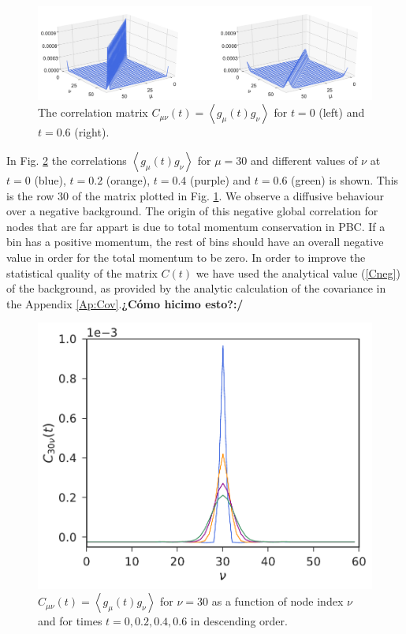 \documentclass[b5paper,openright,10pt]{book}
\newcommand{\Note}[1]{{\bf \color{red}#1}}    %
\newcommand{\llangle}{\left\langle}
\newcommand{\rrangle}{\right\rangle}
\begin{document}
\begin{figure}[h!]
\centering
\includegraphics[width=\linewidth]{Ct-matrix-PBC}
\caption[Correlation matrix $C(t)$ at $t=0$ and $t=0.6$ for an unconfined fluid]{The   correlation    matrix   $C_{\mu\nu}(t)=\llangle
g_{\mu}(t)  g_\nu\rrangle$ for  $t=0$ (left) and $t=0.6$ (right).}
\label{fig:Ct-matrix-PBC}
\end{figure}

In  Fig.    \ref{fig:Ct-mu30nu-PBC}  the   correlations  $\llangle
g_{\mu}(t)  g_\nu\rrangle$ for  $\mu=30$ and  different values  of
$\nu$ at $t=0$ (blue), $t=0.2$ (orange), $t=0.4$ (purple) and $t= 0.6$ (green) is shown.  This is the row 30 of the matrix plotted
in Fig. \ref{fig:Ct-matrix-PBC}.  We  observe a diffusive
behaviour over  a negative  background.  The  origin of  this negative
global  correlation for  nodes that  are far  appart is  due to  total
momentum conservation in PBC.  If a bin has  a positive momentum, the rest of
bins should  have an  overall negative  value in  order for  the total
momentum to  be zero. In order  to improve the statistical  quality of
the matrix  $C(t)$ we have  used the analytical value  (\ref{Cneg}) of
the  background,  as  provided  by the  analytic  calculation  of  the
covariance in the Appendix \ref{Ap:Cov}.\Note{¿Cómo hicimo esto?:/}

\begin{figure}[h!]
\centering
\includegraphics[scale=0.41]{Ct-mu30nu-PBC}
\caption[$C_{30\nu}(t)$ for an uncofined fluid]{$C_{\mu\nu}(t)=\llangle  g_{\mu}(t) g_\nu\rrangle$  for $\nu=30$
 as a  function of node index  $\nu$ and for times $t=0, 0.2, 0.4, 0.6$ in descending order.}
 \label{fig:Ct-mu30nu-PBC} 
\end{figure}
\end{document}
